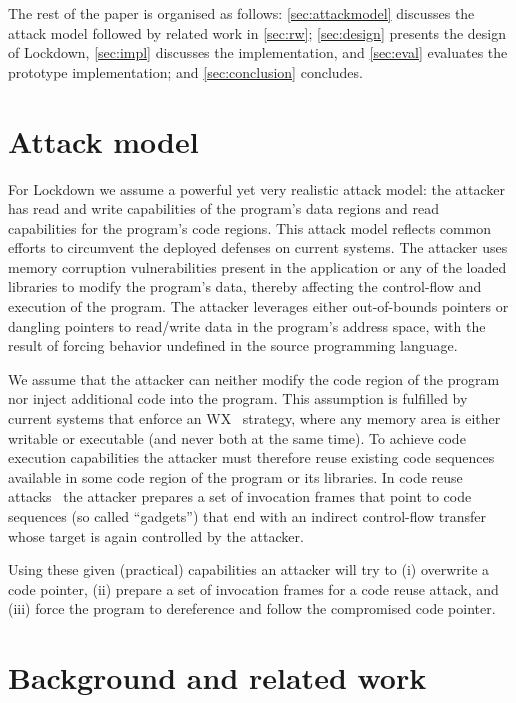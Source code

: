 \documentclass{acm_proc_article-sp}
\begin{document}
The rest of the paper is organised as follows: \autoref{sec:attackmodel}
discusses the attack model followed by related work in \autoref{sec:rw};
\autoref{sec:design} presents the design of Lockdown, \autoref{sec:impl}
discusses the implementation, and \autoref{sec:eval} evaluates the prototype
implementation; and \autoref{sec:conclusion} concludes.



\section{Attack model}\label{sec:attackmodel}


For Lockdown we assume a powerful yet very realistic attack model: the attacker
has read and write capabilities of the program's data regions and read
capabilities for the program's code regions. This attack model reflects common
efforts to circumvent the deployed defenses on current systems.  The attacker
uses memory corruption vulnerabilities present in the application or any of the
loaded libraries to modify the program's data, thereby affecting the
control-flow and execution of the program. 
The attacker leverages either out-of-bounds pointers or dangling pointers to
read/write data in the program's address space, with the result of forcing
behavior undefined in the source programming language.

We assume that the attacker can neither modify the code region of the
program nor inject additional code into the program. This assumption is
fulfilled by current systems that enforce an WX~\cite{execshield}
strategy, where any memory area is either writable or executable 
(and never both at the same time). To achieve code execution 
capabilities the attacker must therefore reuse existing code sequences
available in some code region of the program or its libraries. In code reuse
attacks~\cite{ret2libc, nergal07ret2libc, beyondstacksmashing, bletsch11asiaccs,
beyondstacksmashing, bittau14sp, bosman14sp} the attacker prepares a set of
invocation frames that point to code sequences (so called ``gadgets'') that end
with an indirect control-flow transfer whose target is again controlled by the
attacker.

Using these given (practical) capabilities an attacker will try to (i) overwrite
a code pointer, (ii) prepare a set of invocation frames for a code reuse attack,
and (iii) force the program to dereference and follow the compromised code
pointer.


\section{Background and related work}\label{sec:rw}
\end{document}
